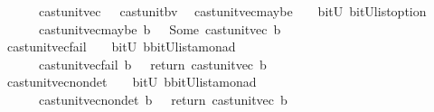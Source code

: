 \begin{isabellebody}
\ \ \ \ \ {\isachardoublequoteopen}\ cast{\isacharunderscore}unit{\isacharunderscore}vec\ {\isacharequal}\ {\isacharparenleft}\ cast{\isacharunderscore}unit{\isacharunderscore}bv\ {\isacharparenright}{\isachardoublequoteclose}\isanewline
\isanewline
{}\isamarkupfalse%
\ cast{\isacharunderscore}unit{\isacharunderscore}vec{\isacharunderscore}maybe\ \ {\isacharcolon}{\isacharcolon}\ {\isachardoublequoteopen}\ bitU\ {\isasymRightarrow}{\isacharparenleft}{\isacharparenleft}bitU{\isacharparenright}list{\isacharparenright}option\ {\isachardoublequoteclose}\ \ \ \isanewline
\ \ \ \ \ {\isachardoublequoteopen}\ cast{\isacharunderscore}unit{\isacharunderscore}vec{\isacharunderscore}maybe\ b\ {\isacharequal}\ {\isacharparenleft}\ Some\ {\isacharparenleft}cast{\isacharunderscore}unit{\isacharunderscore}vec\ b{\isacharparenright}{\isacharparenright}{\isachardoublequoteclose}\isanewline
\isanewline
{}\isamarkupfalse%
\ cast{\isacharunderscore}unit{\isacharunderscore}vec{\isacharunderscore}fail\ \ {\isacharcolon}{\isacharcolon}\ {\isachardoublequoteopen}\ bitU\ {\isasymRightarrow}{\isacharparenleft}{\isacharprime}b{\isacharcomma}{\isacharparenleft}{\isacharparenleft}bitU{\isacharparenright}list{\isacharparenright}{\isacharcomma}{\isacharprime}a{\isacharparenright}monad\ {\isachardoublequoteclose}\ \ \ \isanewline
\ \ \ \ \ {\isachardoublequoteopen}\ cast{\isacharunderscore}unit{\isacharunderscore}vec{\isacharunderscore}fail\ b\ {\isacharequal}\ {\isacharparenleft}\ return\ {\isacharparenleft}cast{\isacharunderscore}unit{\isacharunderscore}vec\ b{\isacharparenright}{\isacharparenright}{\isachardoublequoteclose}\isanewline
\isanewline
{}\isamarkupfalse%
\ cast{\isacharunderscore}unit{\isacharunderscore}vec{\isacharunderscore}nondet\ \ {\isacharcolon}{\isacharcolon}\ {\isachardoublequoteopen}\ bitU\ {\isasymRightarrow}{\isacharparenleft}{\isacharprime}b{\isacharcomma}{\isacharparenleft}{\isacharparenleft}bitU{\isacharparenright}list{\isacharparenright}{\isacharcomma}{\isacharprime}a{\isacharparenright}monad\ {\isachardoublequoteclose}\ \ \ \isanewline
\ \ \ \ \ {\isachardoublequoteopen}\ cast{\isacharunderscore}unit{\isacharunderscore}vec{\isacharunderscore}nondet\ b\ {\isacharequal}\ {\isacharparenleft}\ return\ {\isacharparenleft}cast{\isacharunderscore}unit{\isacharunderscore}vec\ b{\isacharparenright}{\isacharparenright}{\isachardoublequoteclose}\isanewline
\isanewline
\isanewline
%
\end{isabellebody}
